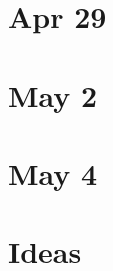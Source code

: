 \documentclass[12pt]{book}
\newcommand{\<}{\langle}
\renewcommand{\>}{\rangle}
\numberwithin{equation}{section}
\theoremstyle{plain}
\theoremstyle{definition}
\theoremstyle{remark}
\begin{document}
\section*{Apr 29}

\section*{May 2}

\section*{May 4}




\newpage

\section*{Ideas}
\end{document}
